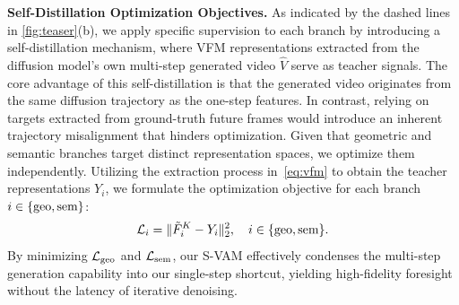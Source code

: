\noindent \textbf{Self-Distillation Optimization Objectives.}
As indicated by the dashed lines in \cref{fig:teaser}(b), we apply specific supervision to each branch by introducing a self-distillation mechanism, where VFM representations extracted from the diffusion model's own multi-step generated video $\hat{V}$ serve as teacher signals. The core advantage of this self-distillation is that the generated video originates from the same diffusion trajectory as the one-step features. In contrast, relying on targets extracted from ground-truth future frames would introduce an inherent trajectory misalignment that hinders optimization. Given that geometric and semantic branches target distinct representation spaces, we optimize them independently. Utilizing the extraction process in~\cref{eq:vfm} to obtain the teacher representations $Y_{i}$, we formulate the optimization objective for each branch $i \in \{\textnormal{geo}, \textnormal{sem}\}$:
\begin{equation}
    \mathcal{L}_{i} = \| \tilde{F}_{i}^K - Y_{i} \|_2^2, \quad i \in \{\textnormal{geo}, \textnormal{sem}\}. 
    \label{eq:distill_loss}
\end{equation}
By minimizing $\mathcal{L}_\textnormal{geo}$ and $\mathcal{L}_\textnormal{sem}$, our S-VAM effectively condenses the multi-step generation capability into our single-step shortcut, yielding high-fidelity foresight without the latency of iterative denoising.




